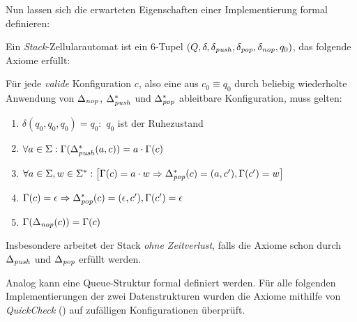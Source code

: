 \documentclass{article}
\begin{document}
Nun lassen sich die erwarteten Eigenschaften einer Implementierung formal definieren:
\begin{definition}
    Ein \emph{Stack}-Zellularautomat ist ein 6-Tupel $(Q, \delta, \delta_{\mathit{push}}, \delta_{\mathit{pop}}, \delta_{\mathit{nop}}, q_0)$, das folgende Axiome erfüllt:

    Für jede \emph{valide} Konfiguration $c$, also eine aus $c_0 \equiv q_0$ durch beliebig wiederholte Anwendung von $\Delta_\mathit{nop}$, $\Delta^*_\mathit{push}$ und $\Delta^*_\mathit{pop}$ ableitbare Konfiguration, muss gelten:
    \begin{enumerate}
        \item $\delta(q_0, q_0, q_0) = q_0$: $\,q_0$ ist der Ruhezustand
        \item $\forall a \in \Sigma: \Gamma(\Delta^*_{\mathit{push}}(a,c)) = a \cdot \Gamma(c)$
        \item $\forall a \in \Sigma, w \in \Sigma^*: \left[ \Gamma(c) = a \cdot w \Rightarrow \Delta^*_{\mathit{pop}}(c) = (a,c'), \Gamma(c') = w \right]$
        \item $\Gamma(c) = \epsilon \Rightarrow \Delta^*_{\mathit{pop}}(c) = (\epsilon,c'), \Gamma(c') = \epsilon$
        \item $\Gamma(\Delta_{\mathit{nop}}(c)) = \Gamma(c)$
    \end{enumerate}
    Insbesondere arbeitet der Stack \emph{ohne Zeitverlust}, falls die Axiome schon durch $\Delta_{\mathit{push}}$ und $\Delta_{\mathit{pop}}$ erfüllt werden.
\end{definition}

Analog kann eine Queue-Struktur formal definiert werden. Für alle folgenden Implementierungen der zwei Datenstrukturen wurden die Axiome mithilfe von \emph{QuickCheck} (\cite{hughes00}) auf zufälligen Konfigurationen überprüft.
\end{document}
